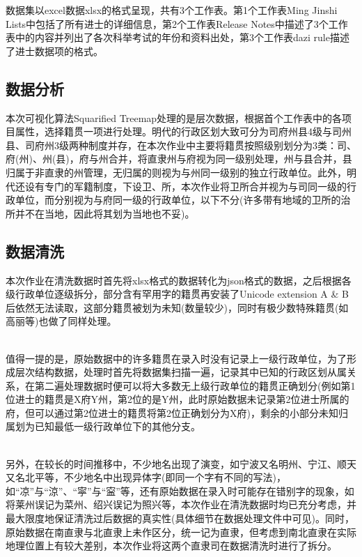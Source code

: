 \documentclass[11pt]{article}
\begin{document}
	数据集以excel数据xlsx的格式呈现，共有3个工作表。第1个工作表Ming Jinshi Lists中包括了所有进士的详细信息，第2个工作表Release Notes中描述了3个工作表中的内容并列出了各次科举考试的年份和资料出处，第3个工作表dazi rule描述了进士数据项的格式。
	
	\subsection{数据分析}
	本次可视化算法Squarified Treemap处理的是层次数据，根据首个工作表中的各项目属性，选择籍贯一项进行处理。明代的行政区划大致可分为司府州县4级与司州县、司府州3级两种制度并存，在本次作业中主要将籍贯按照级别划分为3类：司、府(州)、州(县)，府与州合并，将直隶州与府视为同一级别处理，州与县合并，县归属于非直隶的州管理，无归属的则视为与州同一级别的独立行政单位。此外，明代还设有专门的军籍制度，下设卫、所，本次作业将卫所合并视为与司同一级的行政单位，而分别视为与府同一级的行政单位，以下不分(许多带有地域的卫所的治所并不在当地，因此将其划为当地也不妥)。
	
	\subsection{数据清洗}
	本次作业在清洗数据时首先将xlsx格式的数据转化为json格式的数据，之后根据各级行政单位逐级拆分，部分含有罕用字的籍贯再安装了Unicode extension A \& B后依然无法读取，这部分籍贯被划为未知(数量较少)，同时有极少数特殊籍贯(如高丽等)也做了同样处理。
	
	\hspace*{\fill} \\
	
	值得一提的是，原始数据中的许多籍贯在录入时没有记录上一级行政单位，为了形成层次结构数据，处理时首先将数据集扫描一遍，记录其中已知的行政区划从属关系，在第二遍处理数据时便可以将大多数无上级行政单位的籍贯正确划分(例如第1位进士的籍贯是X府Y州，第2位的是Y州，此时原始数据未记录第2位进士所属的府，但可以通过第2位进士的籍贯将第2位正确划分为X府)，剩余的小部分未知归属划为已知最低一级行政单位下的其他分支。
	
	\hspace*{\fill} \\
	
	另外，在较长的时间推移中，不少地名出现了演变，如宁波又名明州、宁江、顺天又名北平等，不少地名中出现异体字(即同一个字有不同的写法)，如“凉”与“涼”、“寜”与“寍”等，还有原始数据在录入时可能存在错别字的现象，如将莱州误记为菜州、绍兴误记为照兴等，本次作业在清洗数据时均已充分考虑，并最大限度地保证清洗过后数据的真实性(具体细节在数据处理文件中可见)。同时，原始数据在南直隶与北直隶上未作区分，统一记为直隶，但考虑到南北直隶在实际地理位置上有较大差别，本次作业将这两个直隶司在数据清洗时进行了拆分。
	
\end{document}
